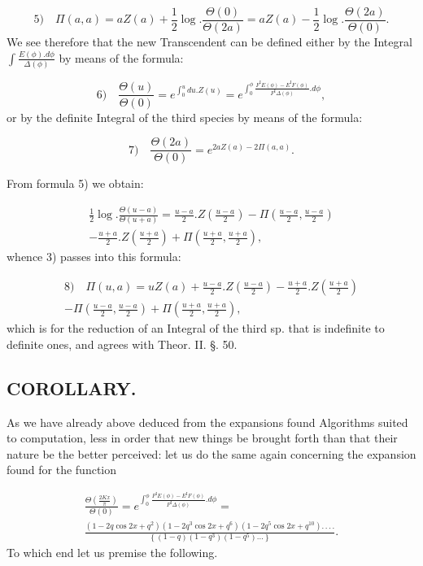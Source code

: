 \documentclass{article}
\begin{document}
\[
\text{5)}\quad \Pi(a,a)=aZ(a)+\frac{1}{2}\log.\frac{\Theta(0)}{\Theta(2a)}=aZ(a)-\frac{1}{2}\log.\frac{\Theta(2a)}{\Theta(0)}.
\]
We see therefore that the new Transcendent can be defined either by the Integral $\displaystyle\int\frac{E(\phi).d\phi}{\Delta(\phi)}$ by means of the formula:

\[
\text{6)}\quad \frac{\Theta(u)}{\Theta(0)}=e^{\int_{0}^{u}du.Z(u)}=e^{\int_{0}^{\phi}\frac{F^{\mathrm{I}}E(\phi)-E^{\mathrm{I}}F(\phi)}{F^{\mathrm{I}}\Delta(\phi)}.d\phi},
\]
or by the definite Integral of the third species by means of the formula:

\[
\text{7)}\quad \frac{\Theta(2a)}{\Theta(0)}=e^{2aZ(a)-2\Pi(a,a)}.
\]

From formula 5) we obtain:

\[
\begin{gathered}
\frac{1}{2}\log.\frac{\Theta(u-a)}{\Theta(u+a)}=\frac{u-a}{2}.Z\left(\frac{u-a}{2}\right)-\Pi\left(\frac{u-a}{2},\frac{u-a}{2}\right)\\[1.5ex]
-\frac{u+a}{2}.Z\left(\frac{u+a}{2}\right)+\Pi\left(\frac{u+a}{2},\frac{u+a}{2}\right),
\end{gathered}
\]
whence 3) passes into this formula:

\[
\begin{gathered}
\text{8)}\quad \Pi(u,a)=uZ(a)+\frac{u-a}{2}.Z\left(\frac{u-a}{2}\right)-\frac{u+a}{2}.Z\left(\frac{u+a}{2}\right)\\[1.5ex]
-\Pi\left(\frac{u-a}{2},\frac{u-a}{2}\right)+\Pi\left(\frac{u+a}{2},\frac{u+a}{2}\right),
\end{gathered}
\]
which is for the reduction of an Integral of the third sp. that is indefinite to definite ones, and agrees with Theor. II. §. 50.

\subsection*{COROLLARY.}

As we have already above deduced from the expansions found Algorithms suited to computation, less in order that new things be brought forth than that their nature be the better perceived: let us do the same again concerning the expansion found for the function

\[
\begin{gathered}
\frac{\Theta\left(\frac{2Kx}{\pi}\right)}{\Theta(0)}=e^{\int_{0}^{\phi}\frac{F^{\mathrm{I}}E(\phi)-E^{\mathrm{I}}F(\phi)}{F^{\mathrm{I}}\Delta(\phi)}.d\phi}=\\[1.5ex]
\frac{(1-2q\cos2x+q^{2})(1-2q^{3}\cos2x+q^{6})(1-2q^{5}\cos2x+q^{10}).\,.\,.\,.}{\left\{(1-q)(1-q^{3})(1-q^{5})\ldots\right\}}.
\end{gathered}
\]
To which end let us premise the following.
\end{document}
